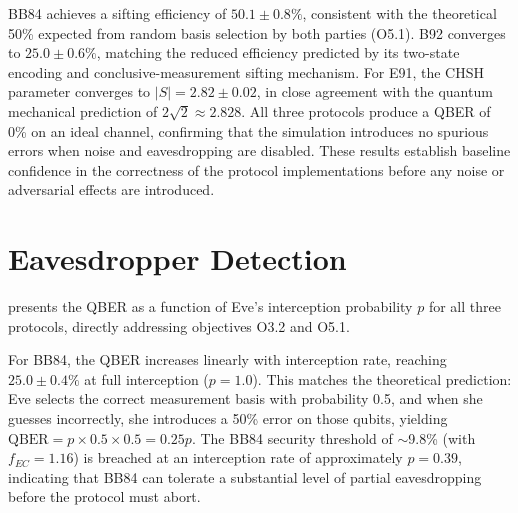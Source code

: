 BB84 achieves a sifting efficiency of $50.1 \pm 0.8\%$, consistent with the theoretical 50\% expected from random basis selection by both parties (O5.1). B92 converges to $25.0 \pm 0.6\%$, matching the reduced efficiency predicted by its two-state encoding and conclusive-measurement sifting mechanism. For E91, the CHSH parameter converges to $|S| = 2.82 \pm 0.02$, in close agreement with the quantum mechanical prediction of $2\sqrt{2} \approx 2.828$. All three protocols produce a QBER of 0\% on an ideal channel, confirming that the simulation introduces no spurious errors when noise and eavesdropping are disabled. These results establish baseline confidence in the correctness of the protocol implementations before any noise or adversarial effects are introduced.




\section{Eavesdropper Detection}


 presents the QBER as a function of Eve's interception probability $p$ for all three protocols, directly addressing objectives O3.2 and O5.1.

For BB84, the QBER increases linearly with interception rate, reaching $25.0 \pm 0.4\%$ at full interception ($p = 1.0$). This matches the theoretical prediction: Eve selects the correct measurement basis with probability 0.5, and when she guesses incorrectly, she introduces a 50\% error on those qubits, yielding $\text{QBER} = p \times 0.5 \times 0.5 = 0.25p$. The BB84 security threshold of $\sim$9.8\% (with $f_{EC} = 1.16$) is breached at an interception rate of approximately $p = 0.39$, indicating that BB84 can tolerate a substantial level of partial eavesdropping before the protocol must abort.

